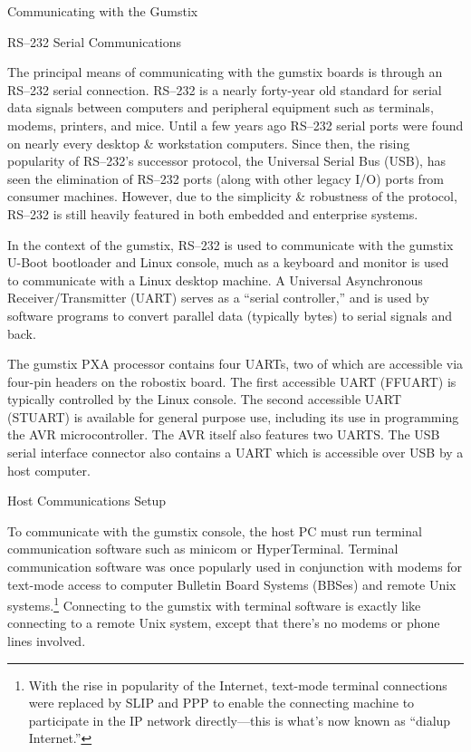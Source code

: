 \documentclass{article}
\begin{document}
	\begin{section}{Communicating with the Gumstix} \label{serial}
	\begin{subsection}{RS--232 Serial Communications}
	
	The principal means of communicating with the gumstix boards
	is through an RS--232 serial connection.  RS--232 is a nearly
	forty-year old standard for serial data signals between
	computers and peripheral equipment such as terminals, modems,
	printers, and mice.  Until a few years ago RS--232 serial
	ports were found on nearly every desktop \& workstation
	computers.  Since then, the rising popularity of RS--232's
	successor protocol, the Universal Serial Bus (USB), has seen
	the elimination of RS--232 ports (along with other legacy I/O)
	ports from consumer machines.  However, due to the simplicity
	\& robustness of the protocol, RS--232 is still heavily
	featured in both embedded and enterprise systems.

	In the context of the gumstix, RS--232 is used to communicate
	with the gumstix U-Boot bootloader and Linux console, much as
	a keyboard and monitor is used to communicate with a Linux
	desktop machine.  A Universal Asynchronous
	Receiver/Transmitter (UART) serves as a ``serial controller,''
	and is used by software programs to convert parallel data
	(typically bytes) to serial signals and back.

	The gumstix PXA processor contains four UARTs, two of which
	are accessible via four-pin headers on the robostix board.
	The first accessible UART (FFUART) is typically controlled by
	the Linux console.  The second accessible UART (STUART) is
	available for general purpose use, including its use in
	programming the AVR microcontroller.  The AVR itself also
	features two UARTS.  The USB serial interface connector also
	contains a UART which is accessible over USB by a host
	computer.  
	\end{subsection}

	\begin{subsection}{Host Communications Setup} \label{hostcomm}
			
	To communicate with the gumstix console, the host PC must run
	terminal communication software such as minicom or
	HyperTerminal.  Terminal communication software was once
	popularly used in conjunction with modems for text-mode access
	to computer Bulletin Board Systems (BBSes) and remote Unix
	systems.\footnote{With the rise in popularity of the Internet,
	text-mode terminal connections were replaced by SLIP and PPP
	to enable the connecting machine to participate in the IP
	network directly---this is what's now known as ``dialup
	Internet.''}  Connecting to the gumstix with terminal software
	is exactly like connecting to a remote Unix system, except
	that there's no modems or phone lines involved.


\end{subsection}
\end{section}
\end{document}
